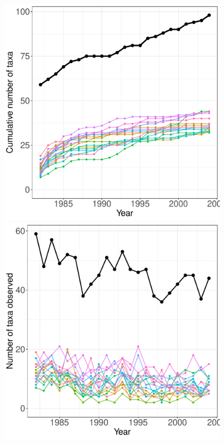 \documentclass[11pt, oneside]{article}
\begin{document}
\begin{figure}[h!]
\centering
\includegraphics[scale = 0.4]{cdr-plantsABC-compagnoni_species_accumulation_curve.pdf}
\includegraphics[scale = 0.4]{cdr-plantsABC-compagnoni_num_taxa_over_time.pdf}

\end{figure}
\end{document}
